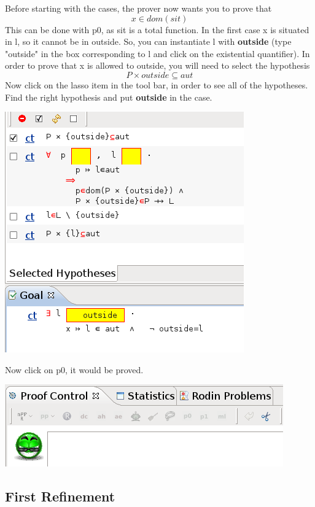 Before starting with the cases, the prover now wants you to prove that 
\[
 x \in dom(sit)
\]
This can be done with p0, as sit is a total function. In the first case x is situated in l, so it cannot be in outside. So, you can instantiate l with \textbf{outside} (type "outside" in the box corresponding to l and click on the existential quantifier). In order to prove that x is allowed to outside, you will need to select the hypothesis
\[
P \times outside \subseteq aut
\]
Now click on the lasso item in the tool bar, in order to see all of the hypotheses. Find the right hypothesis and put \textbf{outside} in the case.
\begin{center}
	\includegraphics[]{img/tutorial/tut_10_outside.png}
\end{center}

Now click on p0, it would be proved.

\begin{center}
	\includegraphics[]{img/tutorial/tut_10_proved.png}
\end{center}

\subsection{First Refinement}


